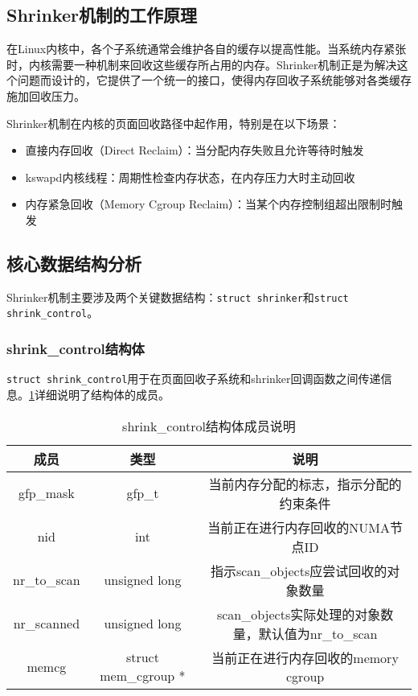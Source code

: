 \subsection{Shrinker机制的工作原理}

在Linux内核中，各个子系统通常会维护各自的缓存以提高性能。当系统内存紧张时，内核需要一种机制来回收这些缓存所占用的内存。Shrinker机制正是为解决这个问题而设计的，它提供了一个统一的接口，使得内存回收子系统能够对各类缓存施加回收压力。

Shrinker机制在内核的页面回收路径中起作用，特别是在以下场景：
\begin{itemize}
    \item 直接内存回收（Direct Reclaim）：当分配内存失败且允许等待时触发
    \item kswapd内核线程：周期性检查内存状态，在内存压力大时主动回收
    \item 内存紧急回收（Memory Cgroup Reclaim）：当某个内存控制组超出限制时触发
\end{itemize}

\subsection{核心数据结构分析}

Shrinker机制主要涉及两个关键数据结构：\texttt{struct shrinker}和\texttt{struct shrink\_control}。

\subsubsection{shrink\_control结构体}

\texttt{struct shrink\_control}用于在页面回收子系统和shrinker回调函数之间传递信息。\ref{tab:shrink_control_struct}详细说明了结构体的成员。

\begin{table}[htbp]
\label{tab:shrink_control_struct}
\centering
\begin{tabular}{ccc}
\toprule
\textbf{成员} & \textbf{类型} & \textbf{说明} \\
\midrule
gfp\_mask & gfp\_t & 当前内存分配的标志，指示分配的约束条件 \\
\midrule
nid & int & 当前正在进行内存回收的NUMA节点ID \\
\midrule
nr\_to\_scan & unsigned long & 指示scan\_objects应尝试回收的对象数量\\
\midrule
nr\_scanned & unsigned long & scan\_objects实际处理的对象数量，默认值为nr\_to\_scan \\
\midrule
memcg & struct mem\_cgroup * & 当前正在进行内存回收的memory cgroup \\
\bottomrule
\end{tabular}
\caption{shrink\_control结构体成员说明}
\end{table}

